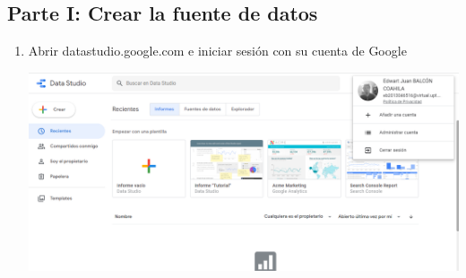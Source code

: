 \documentclass{article}
\begin{document}
    \subsection{Parte I: Crear la fuente de datos}
    \begin{enumerate}[\tab 1.]
        \item Abrir datastudio.google.com e iniciar sesión con su cuenta de Google
        \begin{center}
            \includegraphics[width=13cm]{./images/1.png}
        \end{center}
        

\end{enumerate}
\end{document}
